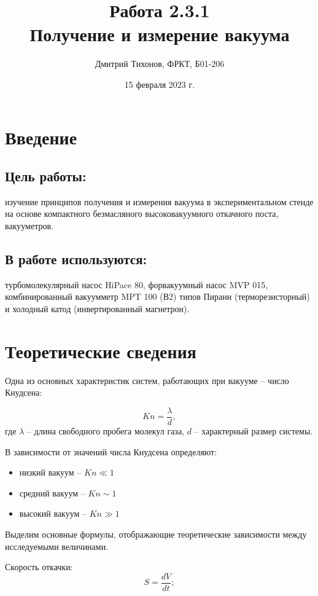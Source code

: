 \documentclass[a4paper, 12pt]{article}
\title{Работа 2.3.1 \\ Получение и измерение вакуума}
\author{Дмитрий Тихонов, ФРКТ, Б01-206}
\date{15 февраля 2023 г.}
\begin{document}
	\maketitle

    \section*{Введение}
        \subsection*{Цель работы:} изучение принципов получения и измерения вакуума в экспериментальном стенде на основе компактного безмасляного высоковакуумного откачного поста, вакууметров.
        \subsection*{В работе используются:} турбомолекулярный насос HiPace 80, форвакуумный насос MVP 015, комбинированный вакуумметр MPT 100 (В2) типов Пирани (терморезисторный) и холодный катод (инвертированный магнетрон).
        
    \section*{Теоретические сведения}
        Одна из основных характеристик систем, работающих при вакууме -- число Кнудсена:

        \begin{equation}
            Kn = \frac{\lambda}{d}, 
        \end{equation}
        где $\lambda$ -- длина свободного пробега молекул газа, $d$ -- характерный размер системы.

        В зависимости от значений числа Кнудсена определяют:
        \begin{itemize}
            \item низкий вакуум -- $Kn \ll 1$
            \item средний вакуум -- $Kn \sim 1$
            \item высокий вакуум -- $Kn \gg 1$
        \end{itemize}

        Выделим основные формулы, отображающие теоретические зависимости между исследуемыми величинами.

        Скорость откачки:
        \begin{equation}
            S = \frac{dV}{dt};
        \end{equation}	
\end{document}
